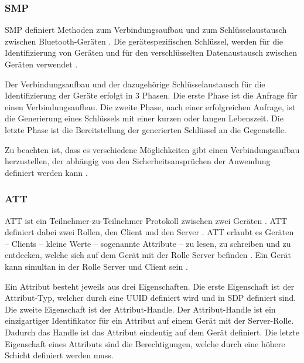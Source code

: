 \subsubsection{\acf{SMP}}
\ac{SMP} definiert Methoden zum Verbindungsaufbau und zum Schlüsselaustausch zwischen Bluetooth-Geräten \cite[S.~1554]{bluetoothCore}. Die gerätespezifischen Schlüssel, werden für die Identifizierung von Geräten und für den verschlüsselten Datenaustausch zwischen Geräten verwendet \cites[S.~1556]{bluetoothCore}[S.~18]{siliconBLE}.

Der Verbindungsaufbau und der dazugehörige Schlüsselaustausch für die Identifizierung der Geräte erfolgt in 3 Phasen. Die erste Phase ist die Anfrage für einen Verbindungsaufbau. Die zweite Phase, nach einer erfolgreichen Anfrage, ist die Generierung eines Schlüssels mit einer kurzen oder langen Lebenszeit. Die letzte Phase ist die Bereitstellung der generierten Schlüssel an die Gegenstelle. \cite[S.~1556]{bluetoothCore}

Zu beachten ist, dass es verschiedene Möglichkeiten gibt einen Verbindungsaufbau herzustellen, der abhängig von den Sicherheitsansprüchen der Anwendung definiert werden kann \cite[S.~18]{siliconBLE}.

\subsubsection{\acf{ATT}}
\ac{ATT} ist ein Teilnehmer-zu-Teilnehmer Protokoll zwischen zwei Geräten \cite[S.~206]{bluetoothCore}. \ac{ATT} definiert dabei zwei Rollen, den Client und den Server \cite[S.~1410]{bluetoothCore}. \ac{ATT} erlaubt es Geräten -- Clients -- kleine Werte -- sogenannte Attribute \cite[S.~279]{bluetoothCore} -- zu lesen, zu schreiben und zu entdecken, welche sich auf dem Gerät mit der Rolle Server befinden \cite[S.~1409]{bluetoothCore}. Ein Gerät kann simultan in der Rolle Server und Client sein \cite[S.~279]{bluetoothCore}.

Ein Attribut besteht jeweils aus drei Eigenschaften. Die erste Eigenschaft ist der Attribut-Typ, welcher durch eine \acf{UUID} definiert wird und in \ac{SDP} definiert sind. Die zweite Eigenschaft ist der Attribut-Handle. Der Attribut-Handle ist ein einzigartiger Identifikator für ein Attribut auf einem Gerät mit der Server-Rolle. Dadurch das Handle ist das Attribut eindeutig auf dem Gerät definiert. Die letzte Eigenschaft eines Attributs sind die Berechtigungen, welche durch eine höhere Schicht definiert werden muss. \cite[S.~1410ff.]{bluetoothCore}

